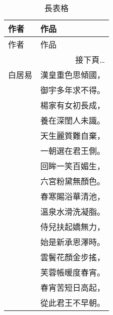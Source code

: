 \begin{longtable}{ll}
\caption{長表格} \\
    \toprule
    作者 & 作品 \\
    \midrule
    \endfirsthead
    \midrule
    作者 & 作品 \\
    \midrule
    \endhead
    \midrule
    \multicolumn{2}{r}{接下頁\dots} \\
    \endfoot
    \bottomrule
    \endlastfoot
    白居易 & 漢皇重色思傾國，\\
    & 御宇多年求不得。\\
    & 楊家有女初長成，\\
    & 養在深閨人未識。\\
    & 天生麗質難自棄，\\
    & 一朝選在君王側。\\
    & 回眸一笑百媚生，\\
    & 六宮粉黛無顏色。\\
    & 春寒賜浴華清池，\\
    & 溫泉水滑洗凝脂。\\
    & 侍兒扶起嬌無力，\\
    & 始是新承恩澤時。\\
    & 雲鬢花顏金步搖，\\
    & 芙蓉帳暖度春宵。\\
    & 春宵苦短日高起，\\
    & 從此君王不早朝。\\
\end{longtable}



\newpage

